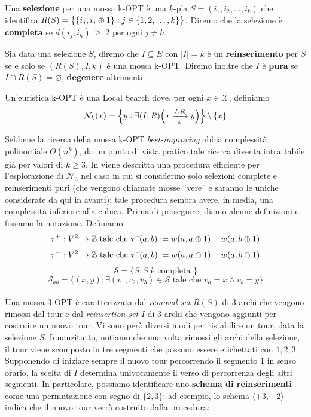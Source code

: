 \begin{definition}
    Una \textbf{selezione} per una mossa k-OPT è una $k$-pla $S = (i_1,i_2,\dots,i_k)$ che identifica 
    $R(S) = \big\{\{i_j,i_j\pls{}1\} : j \in \{1,2,\dots,k\}\big\}$. Diremo che la selezione è
    \textbf{completa} se $d(i_j, i_h)~\ge~2 \text{ per ogni } j\neq{}h$.
\end{definition}

\begin{definition}
    Sia data una selezione $S$, diremo che $I \subseteq E$ con $|I|=k$ è un \textbf{reinserimento} per $S$ se
    e solo se $(R(S),I,k)$ è una mossa k-OPT. Diremo inoltre che $I$ è \textbf{pura} se $I\cap{}R(S)=\varnothing$,
    \textbf{degenere} altrimenti.
\end{definition}

Un'euristica k-OPT è una Local Search dove, per ogni $x \in \mathcal{X}$, definiamo
$$\mathcal{N}_k(x) = \Big\{y : \exists{(I, R)}\Big(x \opt{I}{R}{k} y\Big) \Big\} \setminus \{x\}$$

Sebbene la ricerca della mossa k-OPT \textit{best-improving} abbia complessità polinomiale $\Theta(n^k)$,
da un punto di vista pratico tale ricerca diventa intrattabile già per valori di $k \ge 3$.
In \cite{3opt} viene descritta una procedura efficiente per l'esplorazione di $\mathcal{N}_3$ nel caso
in cui si considerino solo selezioni complete e reinserimenti puri (che vengono chiamate mosse ``vere'' e saranno
le uniche considerate da qui in avanti); tale procedura sembra avere, in media, una complessità inferiore 
alla cubica. Prima di proseguire, diamo alcune definizioni e fissiamo la notazione. Definiamo
$$\tau^+: V^2 \rightarrow \mathbb{Z} \text{ tale che } \taup{a}{b} := w(a,a\pls{}1) - w(a,b\pls{}1)$$
$$\tau^-: V^2 \rightarrow \mathbb{Z} \text{ tale che } \taum{a}{b} := w(a,a\mns{}1) - w(a,b\mns{}1)$$
$$\mathcal{S} = \{S : S \text{ è completa }\}$$
$$\mathcal{S}_{ab} = \big\{ (x,y) : \exists(v_1, v_2, v_3) \in \mathcal{S} \text{ tale che } v_a=x \wedge v_b=y \big\}$$
\ \\
Una mossa 3-OPT è caratterizzata dal \textit{removal set} $R(S)$ di $3$ archi che vengono rimossi dal tour e dal
\textit{reinsertion set} $I$ di $3$ archi che vengono aggiunti per costruire un nuovo tour. Vi sono però
diversi modi per ristabilire un tour, data la selezione $S$. Innanzitutto, notiamo che una volta rimossi
gli archi della selezione, il tour viene scomposto in tre segmenti che possono essere etichettati con $1,2,3$.
Supponendo di iniziare sempre il nuovo tour percorrendo il segmento $1$ in senso orario, la scelta di $I$ 
determina univocamente il verso di percorrenza degli altri segmenti. In particolare, possiamo identificare
uno \textbf{schema di reinserimenti} come una permutazione con segno di $\{2,3\}$: ad esempio, lo schema
$\langle+3,-2\rangle$ indica che il nuovo tour verrà costruito dalla procedura:

